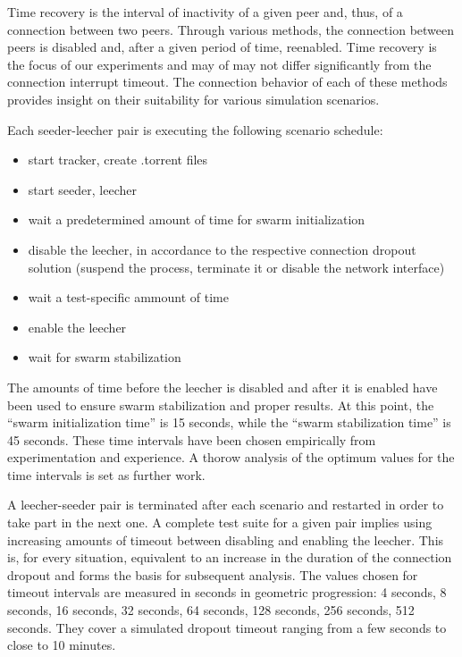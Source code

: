 Time recovery is the interval of inactivity of a given peer and, thus, of a
connection between two peers. Through various methods, the connection between
peers is disabled and, after a given period of time, reenabled. Time recovery
is the focus of our experiments and may of may not differ significantly from
the connection interrupt timeout. The connection behavior of each of these
methods provides insight on their suitability for various simulation
scenarios.

Each seeder-leecher pair is executing the following scenario schedule:

\begin{itemize}
  \item start tracker, create .torrent files
  \item start seeder, leecher
  \item wait a predetermined amount of time for swarm initialization
  \item disable the leecher, in accordance to the respective connection
  dropout solution (suspend the process, terminate it or disable the network
  interface)
  \item wait a test-specific ammount of time
  \item enable the leecher
  \item wait for swarm stabilization
\end{itemize}

The amounts of time before the leecher is disabled and after it is enabled
have been used to ensure swarm stabilization and proper results. At this
point, the ``swarm initialization time'' is 15 seconds, while the ``swarm
stabilization time'' is 45 seconds. These time intervals have been chosen
empirically from experimentation and experience. A thorow analysis of the
optimum values for the time intervals is set as further work.

A leecher-seeder pair is terminated after each scenario and restarted in order
to take part in the next one. A complete test suite for a given pair implies
using increasing amounts of timeout between disabling and enabling the
leecher. This is, for every situation, equivalent to an increase in the
duration of the connection dropout and forms the basis for subsequent
analysis. The values chosen for timeout intervals are measured in seconds in
geometric progression: 4 seconds, 8 seconds, 16 seconds, 32 seconds, 64
seconds, 128 seconds, 256 seconds, 512 seconds. They cover a simulated dropout
timeout ranging from a few seconds to close to 10 minutes.

